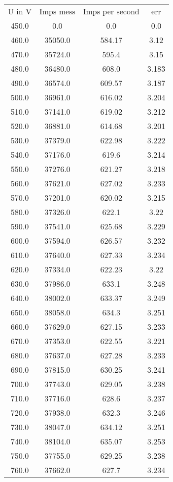 \begin{table}
\begin{tabular}{cccc}
U in V & Imps mess & Imps per second & err \\
450.0 & 0.0 & 0.0 & 0.0 \\
460.0 & 35050.0 & 584.17 & 3.12 \\
470.0 & 35724.0 & 595.4 & 3.15 \\
480.0 & 36480.0 & 608.0 & 3.183 \\
490.0 & 36574.0 & 609.57 & 3.187 \\
500.0 & 36961.0 & 616.02 & 3.204 \\
510.0 & 37141.0 & 619.02 & 3.212 \\
520.0 & 36881.0 & 614.68 & 3.201 \\
530.0 & 37379.0 & 622.98 & 3.222 \\
540.0 & 37176.0 & 619.6 & 3.214 \\
550.0 & 37276.0 & 621.27 & 3.218 \\
560.0 & 37621.0 & 627.02 & 3.233 \\
570.0 & 37201.0 & 620.02 & 3.215 \\
580.0 & 37326.0 & 622.1 & 3.22 \\
590.0 & 37541.0 & 625.68 & 3.229 \\
600.0 & 37594.0 & 626.57 & 3.232 \\
610.0 & 37640.0 & 627.33 & 3.234 \\
620.0 & 37334.0 & 622.23 & 3.22 \\
630.0 & 37986.0 & 633.1 & 3.248 \\
640.0 & 38002.0 & 633.37 & 3.249 \\
650.0 & 38058.0 & 634.3 & 3.251 \\
660.0 & 37629.0 & 627.15 & 3.233 \\
670.0 & 37353.0 & 622.55 & 3.221 \\
680.0 & 37637.0 & 627.28 & 3.233 \\
690.0 & 37815.0 & 630.25 & 3.241 \\
700.0 & 37743.0 & 629.05 & 3.238 \\
710.0 & 37716.0 & 628.6 & 3.237 \\
720.0 & 37938.0 & 632.3 & 3.246 \\
730.0 & 38047.0 & 634.12 & 3.251 \\
740.0 & 38104.0 & 635.07 & 3.253 \\
750.0 & 37755.0 & 629.25 & 3.238 \\
760.0 & 37662.0 & 627.7 & 3.234 \\

\end{tabular}
\end{table}
